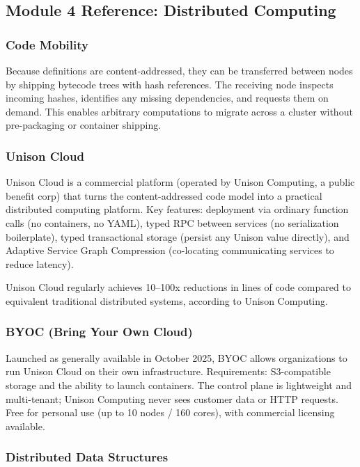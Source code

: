 \documentclass[11pt,letterpaper]{article}
\begin{document}
\subsection{Module 4 Reference: Distributed Computing}

\subsubsection{Code Mobility}

Because definitions are content-addressed, they can be transferred between nodes by shipping bytecode trees with hash references. The receiving node inspects incoming hashes, identifies any missing dependencies, and requests them on demand. This enables arbitrary computations to migrate across a cluster without pre-packaging or container shipping.

\subsubsection{Unison Cloud}

Unison Cloud is a commercial platform (operated by Unison Computing, a public benefit corp) that turns the content-addressed code model into a practical distributed computing platform. Key features: deployment via ordinary function calls (no containers, no YAML), typed RPC between services (no serialization boilerplate), typed transactional storage (persist any Unison value directly), and Adaptive Service Graph Compression (co-locating communicating services to reduce latency).

Unison Cloud regularly achieves 10--100x reductions in lines of code compared to equivalent traditional distributed systems, according to Unison Computing.

\subsubsection{BYOC (Bring Your Own Cloud)}

Launched as generally available in October 2025, BYOC allows organizations to run Unison Cloud on their own infrastructure. Requirements: S3-compatible storage and the ability to launch containers. The control plane is lightweight and multi-tenant; Unison Computing never sees customer data or HTTP requests. Free for personal use (up to 10 nodes / 160 cores), with commercial licensing available.

\subsubsection{Distributed Data Structures}
\end{document}
